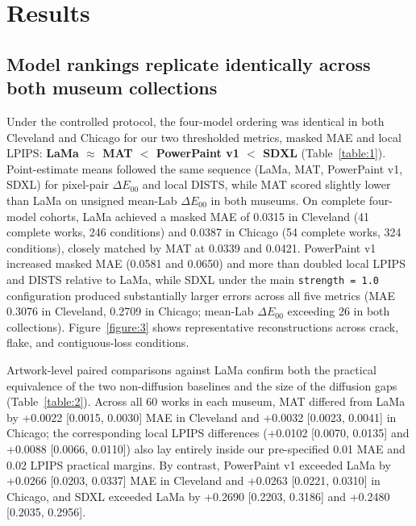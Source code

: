 \documentclass[fleqn,12pt,lineno]{wlpeerj}
\begin{document}
\section{Results}\label{results}

\subsection{Model rankings replicate identically across both museum collections}\label{model-rankings-replicate-identically-across-both-museum-collections}

Under the controlled protocol, the four-model ordering was identical in both Cleveland and Chicago for our two thresholded metrics, masked MAE and local LPIPS: \textbf{LaMa \(\approx\) MAT \(\!<\!\) PowerPaint v1 \(\!<\!\) SDXL} (Table~\ref{table:1}). Point-estimate means followed the same sequence (LaMa, MAT, PowerPaint v1, SDXL) for pixel-pair \texttt{\ensuremath{\Delta E_{00}}} and local DISTS, while MAT scored slightly lower than LaMa on unsigned mean-Lab \texttt{\ensuremath{\Delta E_{00}}} in both museums. On complete four-model cohorts, LaMa achieved a masked MAE of 0.0315 in Cleveland (41 complete works, 246 conditions) and 0.0387 in Chicago (54 complete works, 324 conditions), closely matched by MAT at 0.0339 and 0.0421. PowerPaint v1 increased masked MAE (0.0581 and 0.0650) and more than doubled local LPIPS and DISTS relative to LaMa, while SDXL under the main \texttt{strength\ =\ 1.0} configuration produced substantially larger errors across all five metrics (MAE 0.3076 in Cleveland, 0.2709 in Chicago; mean-Lab \texttt{\ensuremath{\Delta E_{00}}} exceeding 26 in both collections). Figure~\ref{figure:3} shows representative reconstructions across crack, flake, and contiguous-loss conditions.



Artwork-level paired comparisons against LaMa confirm both the practical equivalence of the two non-diffusion baselines and the size of the diffusion gaps (Table~\ref{table:2}). Across all 60 works in each museum, MAT differed from LaMa by +0.0022 {[}0.0015, 0.0030{]} MAE in Cleveland and +0.0032 {[}0.0023, 0.0041{]} in Chicago; the corresponding local LPIPS differences (+0.0102 {[}0.0070, 0.0135{]} and +0.0088 {[}0.0066, 0.0110{]}) also lay entirely inside our pre-specified 0.01 MAE and 0.02 LPIPS practical margins. By contrast, PowerPaint v1 exceeded LaMa by +0.0266 {[}0.0203, 0.0337{]} MAE in Cleveland and +0.0263 {[}0.0221, 0.0310{]} in Chicago, and SDXL exceeded LaMa by +0.2690 {[}0.2203, 0.3186{]} and +0.2480 {[}0.2035, 0.2956{]}.
\end{document}
